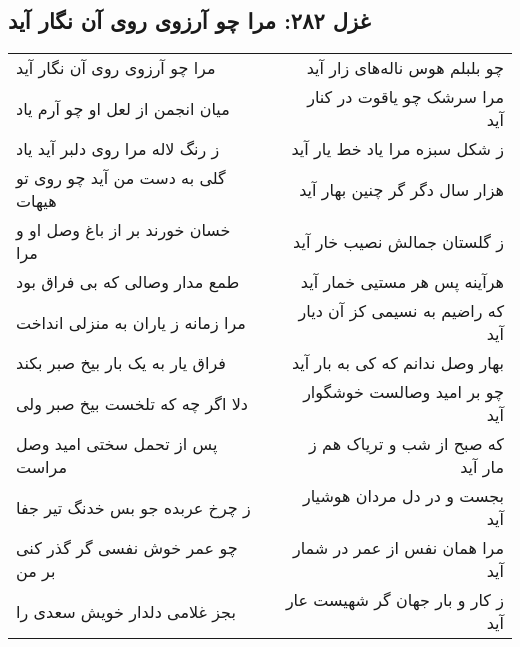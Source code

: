 \begin{center}
\section*{غزل ۲۸۲: مرا چو آرزوی روی آن نگار آید}
\label{sec:282}
\begin{longtable}{l p{0.5cm} r}
مرا چو آرزوی روی آن نگار آید
&&
چو بلبلم هوس ناله‌های زار آید
\\
میان انجمن از لعل او چو آرم یاد
&&
مرا سرشک چو یاقوت در کنار آید
\\
ز رنگ لاله مرا روی دلبر آید یاد
&&
ز شکل سبزه مرا یاد خط یار آید
\\
گلی به دست من آید چو روی تو هیهات
&&
هزار سال دگر گر چنین بهار آید
\\
خسان خورند بر از باغ وصل او و مرا
&&
ز گلستان جمالش نصیب خار آید
\\
طمع مدار وصالی که بی فراق بود
&&
هرآینه پس هر مستیی خمار آید
\\
مرا زمانه ز یاران به منزلی انداخت
&&
که راضیم به نسیمی کز آن دیار آید
\\
فراق یار به یک بار بیخ صبر بکند
&&
بهار وصل ندانم که کی به بار آید
\\
دلا اگر چه که تلخست بیخ صبر ولی
&&
چو بر امید وصالست خوشگوار آید
\\
پس از تحمل سختی امید وصل مراست
&&
که صبح از شب و تریاک هم ز مار آید
\\
ز چرخ عربده جو بس خدنگ تیر جفا
&&
بجست و در دل مردان هوشیار آید
\\
چو عمر خوش نفسی گر گذر کنی بر من
&&
مرا همان نفس از عمر در شمار آید
\\
بجز غلامی دلدار خویش سعدی را
&&
ز کار و بار جهان گر شهیست عار آید
\\
\end{longtable}
\end{center}

